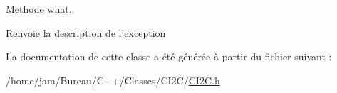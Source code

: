 Methode what. 

\begin{DoxyReturn}{Renvoie}
la description de l'exception 
\end{DoxyReturn}


La documentation de cette classe a été générée à partir du fichier suivant \+:\begin{DoxyCompactItemize}
\item 
/home/jam/\+Bureau/\+C++/\+Classes/\+C\+I2\+C/\hyperlink{CI2C_8h}{C\+I2\+C.\+h}\end{DoxyCompactItemize}
